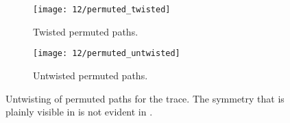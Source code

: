 \begin{figure}
	\setlength{\figspacing}{5 mm}
	\centering
	\begin{subfigure}[b]{\textwidth}
		\centering
		\texttt{[image: 12/permuted\_twisted]}
		\caption{Twisted permuted paths.}
		\label{fig:permuted-twisted}
		\vspace{\figspacing}
	\end{subfigure}
	\begin{subfigure}[b]{\textwidth}
		\centering
		\texttt{[image: 12/permuted\_untwisted]}
		\caption{Untwisted permuted paths.}
		\label{fig:permuted-untwisted}
	\end{subfigure}
	\caption[
		Untwisting of permuted paths
	]{
		Untwisting of permuted paths for the trace.
		The symmetry that is plainly visible in  is not evident in .
	}
\end{figure}
